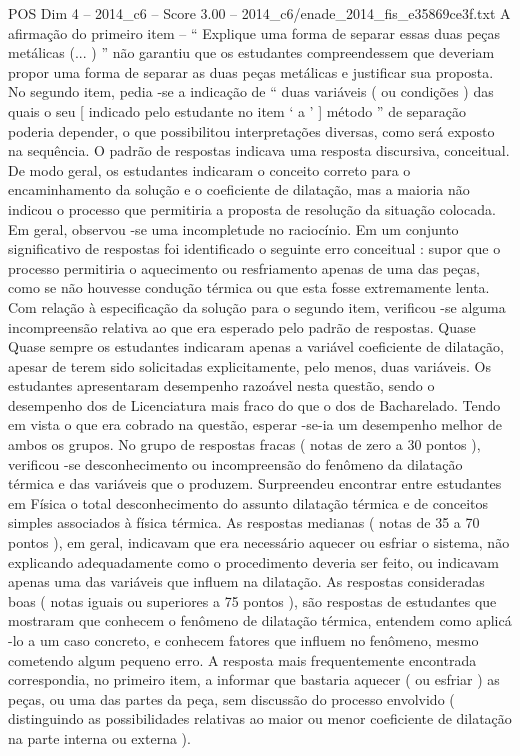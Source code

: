 \begin{textsample}{POS Dim 4 – 2014\_c6 – Score 3.00 – 2014\_c6/enade\_2014\_fis\_e35869ce3f.txt}
A afirmação do primeiro item – “ Explique uma forma de separar essas duas peças metálicas (... ) ” não garantiu que os estudantes compreendessem que deveriam propor uma forma de separar as duas peças metálicas e justificar sua proposta.
No segundo item, pedia -se a indicação de “ duas variáveis ( ou condições ) das quais o seu [ indicado pelo estudante no item ‘ a ’ ] método ” de separação poderia depender, o que possibilitou interpretações diversas, como será exposto na sequência.
O padrão de respostas indicava uma resposta discursiva, conceitual.
De modo geral, os estudantes indicaram o conceito correto para o encaminhamento da solução e o coeficiente de dilatação, mas a maioria não indicou o processo que permitiria a proposta de resolução da situação colocada.
Em geral, observou -se uma incompletude no raciocínio.
Em um conjunto significativo de respostas foi identificado o seguinte erro conceitual : supor que o processo permitiria o aquecimento ou resfriamento apenas de uma das peças, como se não houvesse condução térmica ou que esta fosse extremamente lenta.
Com relação à especificação da solução para o segundo item, verificou -se alguma incompreensão relativa ao que era esperado pelo padrão de respostas.
Quase Quase sempre os estudantes indicaram apenas a variável coeficiente de dilatação, apesar de terem sido solicitadas explicitamente, pelo menos, duas variáveis.
Os estudantes apresentaram desempenho razoável nesta questão, sendo o desempenho dos de Licenciatura mais fraco do que o dos de Bacharelado.
Tendo em vista o que era cobrado na questão, esperar -se-ia um desempenho melhor de ambos os grupos.
No grupo de respostas fracas ( notas de zero a 30 pontos ), verificou -se desconhecimento ou incompreensão do fenômeno da dilatação térmica e das variáveis que o produzem.
Surpreendeu encontrar entre estudantes em Física o total desconhecimento do assunto dilatação térmica e de conceitos simples associados à física térmica.
As respostas medianas ( notas de 35 a 70 pontos ), em geral, indicavam que era necessário aquecer ou esfriar o sistema, não explicando adequadamente como o procedimento deveria ser feito, ou indicavam apenas uma das variáveis que influem na dilatação.
As respostas consideradas boas ( notas iguais ou superiores a 75 pontos ), são respostas de estudantes que mostraram que conhecem o fenômeno de dilatação térmica, entendem como aplicá -lo a um caso concreto, e conhecem fatores que influem no fenômeno, mesmo cometendo algum pequeno erro.
A resposta mais frequentemente encontrada correspondia, no primeiro item, a informar que bastaria aquecer ( ou esfriar ) as peças, ou uma das partes da peça, sem discussão do processo envolvido ( distinguindo as possibilidades relativas ao maior ou menor coeficiente de dilatação na parte interna ou externa ).

\end{textsample}
